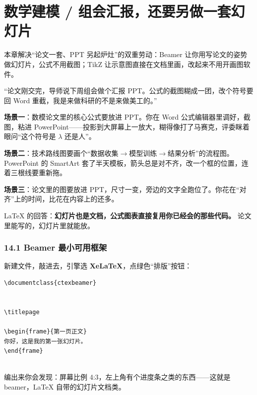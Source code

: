 \chapter{数学建模 / 组会汇报，还要另做一套幻灯片}

\begin{notebox}
本章解决“论文一套、PPT 另起炉灶”的双重劳动：Beamer 让你用写论文的姿势做幻灯片，公式不用截图；TikZ 让示意图直接在文档里画，改起来不用开画图软件。
\end{notebox}


“论文刚交完，导师说下周组会做个汇报 PPT。公式的截图糊成一团，改个符号要回 Word 重截，我是来做科研的不是来做美工的。”


\textbf{场景一}：数模论文里的核心公式要放进 PPT。你在 Word 公式编辑器里调好，截图，粘进 PowerPoint——投影到大屏幕上一放大，糊得像打了马赛克，评委眯着眼问“这个符号是 \ensuremath{\lambda} 还是人”。

\textbf{场景二}：技术路线图要画个“数据收集\ensuremath{\rightarrow}模型训练\ensuremath{\rightarrow}结果分析”的流程图。PowerPoint 的 SmartArt 套了半天模板，箭头总是对不齐，改一个框的位置，连着三根线要重新拖。

\textbf{场景三}：论文里的图要放进 PPT，尺寸一变，旁边的文字全跑位了。你花在“对齐”上的时间，比花在内容上的还多。

LaTeX 的回答：\textbf{幻灯片也是文档，公式图表直接复用你已经会的那些代码。} 论文里能写的，幻灯片里就能放。


\subsection*{14.1 Beamer 最小可用框架}

新建文件，敲进去，引擎选 \textbf{XeLaTeX}，点绿色“排版”按钮：

\begin{lstlisting}
\documentclass{ctexbeamer}


\titlepage

\begin{frame}{第一页正文}
你好，这是我的第一张幻灯片。
\end{frame}


\end{lstlisting}

编出来你会发现：屏幕比例 4:3，左上角有个进度条之类的东西——这就是 beamer，LaTeX 自带的幻灯片文档类。

